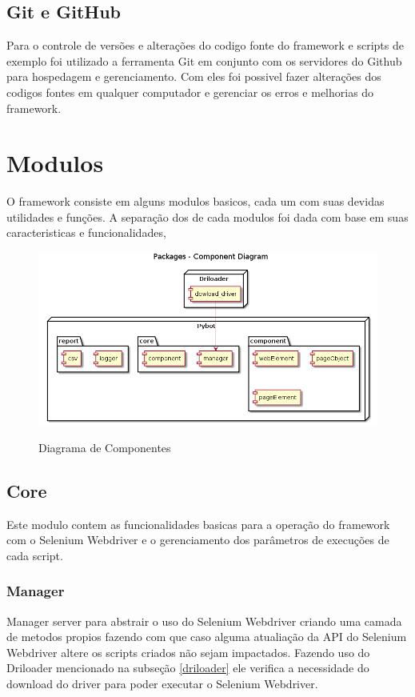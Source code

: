     \subsection{Git e GitHub}
        Para o controle de versões e alterações do codigo fonte do framework e scripts de exemplo foi utilizado a ferramenta
        Git \cite{git} em conjunto com os servidores do Github \cite{github} para hospedagem e gerenciamento. Com eles foi possivel
        fazer alterações dos codigos fontes em qualquer computador e gerenciar os erros e melhorias do framework.


\section{Modulos}

    O framework consiste em alguns modulos basicos, cada um com suas devidas utilidades e funções.
    A separação dos de cada modulos foi dada com base em suas caracteristicas e funcionalidades,

    \begin{figure}[H]
        \vspace*{0,3cm}
        \centering
        \caption{Diagrama de Componentes}
        \includegraphics[width=1\textwidth]{./04-figuras/model}
        \label{fig:modules}
    \end{figure}

    \subsection{Core}
        Este modulo contem as funcionalidades basicas para a operação do framework com o Selenium Webdriver
        e o gerenciamento dos parâmetros de execuções de cada script.

        \subsubsection{Manager}
        Manager server para abstrair o uso do Selenium Webdriver criando uma camada de metodos propios fazendo com que caso alguma
        atualiação da API do Selenium Webdriver altere os scripts criados não sejam impactados. Fazendo uso do Driloader mencionado na
        subseção \ref{driloader} ele verifica a necessidade do download do driver para poder executar o Selenium Webdriver.

